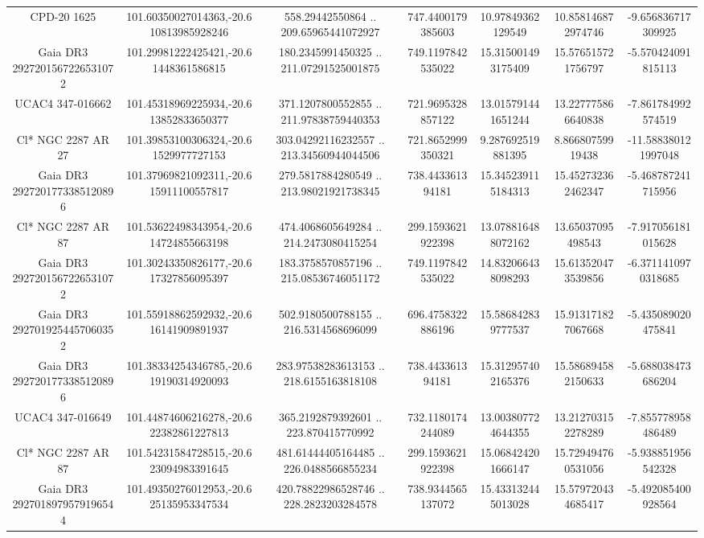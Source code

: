 \begin{table}
\begin{tabular}{ccccccc}
CPD-20  1625 & 101.60350027014363,-20.610813985928246 & 558.29442550864 .. 209.65965441072927 & 747.4400179385603 & 10.97849362129549 & 10.858146872974746 & -9.656836717309925 \\
Gaia DR3 2927201567226531072 & 101.29981222425421,-20.61448361586815 & 180.2345991450325 .. 211.07291525001875 & 749.1197842535022 & 15.315001493175409 & 15.576515721756797 & -5.570424091815113 \\
UCAC4 347-016662 & 101.45318969225934,-20.613852833650377 & 371.1207800552855 .. 211.97838759440353 & 721.9695328857122 & 13.015791441651244 & 13.227775866640838 & -7.861784992574519 \\
Cl* NGC 2287     AR      27 & 101.39853100306324,-20.61529977727153 & 303.04292116232557 .. 213.34560944044506 & 721.8652999350321 & 9.287692519881395 & 8.86680759919438 & -11.588380121997048 \\
Gaia DR3 2927201773385120896 & 101.37969821092311,-20.615911100557817 & 279.5817884280549 .. 213.98021921738345 & 738.443361394181 & 15.345239115184313 & 15.452732362462347 & -5.468787241715956 \\
Cl* NGC 2287     AR      87 & 101.53622498343954,-20.614724855663198 & 474.4068605649284 .. 214.2473080415254 & 299.1593621922398 & 13.078816488072162 & 13.65037095498543 & -7.917056181015628 \\
Gaia DR3 2927201567226531072 & 101.30243350826177,-20.617327856095397 & 183.3758570857196 .. 215.08536746051172 & 749.1197842535022 & 14.832066438098293 & 15.613520473539856 & -6.3711410970318685 \\
Gaia DR3 2927019254457060352 & 101.55918862592932,-20.616141909891937 & 502.9180500788155 .. 216.5314568696099 & 696.4758322886196 & 15.586842839777537 & 15.913171827067668 & -5.435089020475841 \\
Gaia DR3 2927201773385120896 & 101.38334254346785,-20.619190314920093 & 283.97538283613153 .. 218.6155163818108 & 738.443361394181 & 15.312957402165376 & 15.586894582150633 & -5.688038473686204 \\
UCAC4 347-016649 & 101.44874606216278,-20.622382861227813 & 365.2192879392601 .. 223.870415770992 & 732.1180174244089 & 13.003807724644355 & 13.212703152278289 & -7.855778958486489 \\
Cl* NGC 2287     AR      87 & 101.54231584728515,-20.623094983391645 & 481.61444405164485 .. 226.0488566855234 & 299.1593621922398 & 15.068424201666147 & 15.729494760531056 & -5.938851956542328 \\
Gaia DR3 2927018979579196544 & 101.49350276012953,-20.625135953347534 & 420.78822986528746 .. 228.2823203284578 & 738.9344565137072 & 15.433132445013028 & 15.579720434685417 & -5.492085400928564 \\

\end{tabular}
\end{table}

